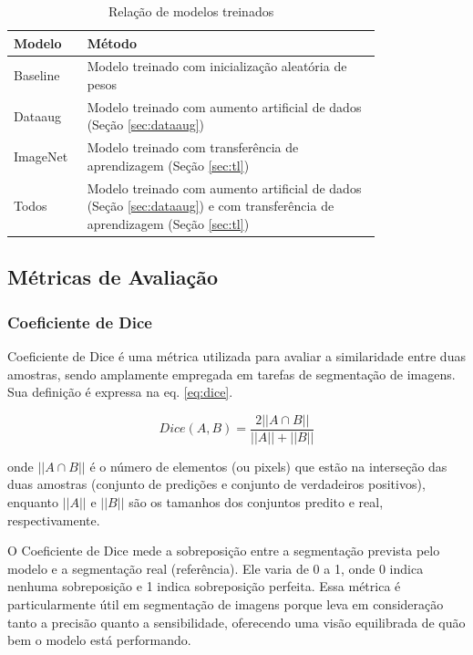 \documentclass[a4,12pt]{horizon-theme}
\begin{document}
\begin{table}[!ht]
  \centering
  \caption{Relação de modelos treinados}
  \label{tab:modelos}
  \begin{tabular}{lp{0.8\linewidth}}
    \toprule
    Modelo   & Método                                                                                                                             \\
    \hline
    Baseline & Modelo treinado com inicialização aleatória de pesos                                                                               \\
    Dataaug  & Modelo treinado com aumento artificial de dados (Seção \ref{sec:dataaug})                                                          \\
    ImageNet & Modelo treinado com transferência de aprendizagem (Seção \ref{sec:tl})                                                             \\
    Todos    & Modelo treinado com aumento artificial de dados (Seção \ref{sec:dataaug}) e com transferência de aprendizagem (Seção \ref{sec:tl}) \\
    \bottomrule
  \end{tabular}
\end{table}

\newpage
\subsection{Métricas de Avaliação}
\label{sec:metricas}

\subsubsection{Coeficiente de Dice}
Coeficiente de Dice é uma métrica utilizada para avaliar a similaridade entre duas amostras, sendo amplamente empregada em tarefas de segmentação de imagens. Sua definição é expressa na eq. \eqref{eq:dice}.

\begin{equation}\label{eq:dice}
  Dice(A, B) = \frac{2||A \cap B||}{||A|| + ||B||}
\end{equation}

onde $||A \cap B||$ é o número de elementos (ou pixels) que estão na interseção das duas amostras (conjunto de predições e conjunto de verdadeiros positivos), enquanto $||A||$  e $||B||$ são os tamanhos dos conjuntos predito e real, respectivamente.

O Coeficiente de Dice mede a sobreposição entre a segmentação prevista pelo modelo e a segmentação real (referência). Ele varia de 0 a 1, onde 0 indica nenhuma sobreposição e 1 indica sobreposição perfeita. Essa métrica é particularmente útil em segmentação de imagens porque leva em consideração tanto a precisão quanto a sensibilidade, oferecendo uma visão equilibrada de quão bem o modelo está performando.
\end{document}
